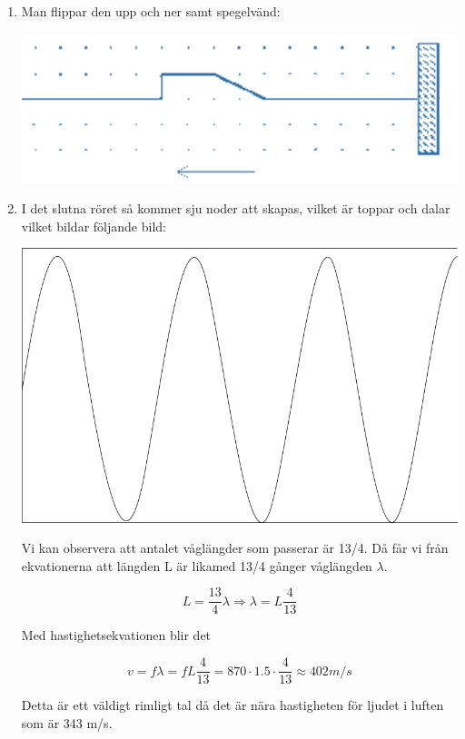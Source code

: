 \documentclass[a4paper,12pt]{article}
\begin{document}
\begin{enumerate}
    \item Man flippar den upp och ner samt spegelvänd:

          \includegraphics{Figur 1.png}

    \item
          I det slutna röret så kommer sju noder att skapas,
          vilket är toppar och dalar vilket bildar följande bild:
          \begin{center}
              \includegraphics[scale=0.5]{Figur 2.png}
          \end{center}

          Vi kan observera att antalet våglängder som passerar
          är 13/4. Då får vi från ekvationerna att längden L är
          likamed 13/4 gånger våglängden $\lambda$.

          $$L=\frac{13}{4}\lambda \Rightarrow \lambda=L\frac{4}{13}$$

          Med hastighetsekvationen blir det

          $$v=f\lambda=fL\frac{4}{13}=870\cdot 1.5\cdot \frac{4}{13}\approx 402m/s$$

          Detta är ett väldigt rimligt tal då det är nära hastigheten
          för ljudet i luften som är 343 m/s.


\end{enumerate}
\end{document}
